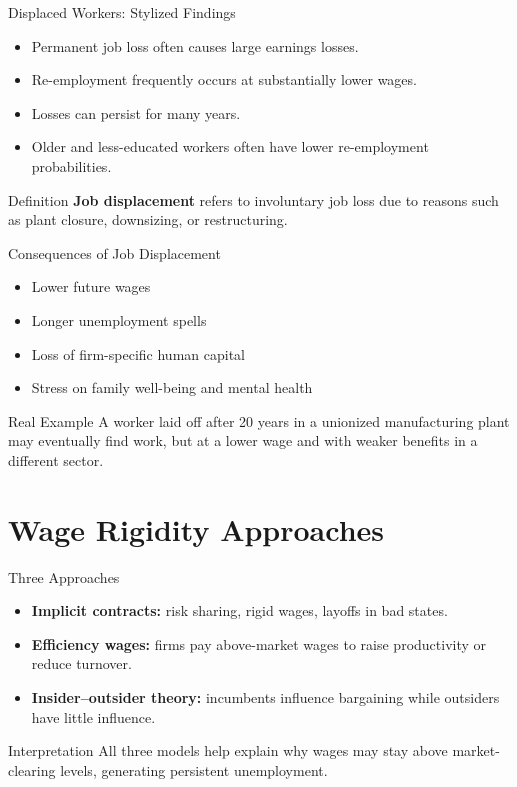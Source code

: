 \documentclass[aspectratio=169]{beamer}
\begin{document}
\begin{frame}{Displaced Workers: Stylized Findings}
\transfade
\begin{itemize}[<+->]
  \item Permanent job loss often causes large earnings losses.
  \item Re-employment frequently occurs at substantially lower wages.
  \item Losses can persist for many years.
  \item Older and less-educated workers often have lower re-employment probabilities.
\end{itemize}

\begin{block}{Definition}
\textbf{Job displacement} refers to involuntary job loss due to reasons such as plant closure, downsizing, or restructuring.
\end{block}
\end{frame}

\begin{frame}{Consequences of Job Displacement}
\transfade
\begin{itemize}[<+->]
  \item Lower future wages
  \item Longer unemployment spells
  \item Loss of firm-specific human capital
  \item Stress on family well-being and mental health
\end{itemize}

\begin{exampleblock}{Real Example}
A worker laid off after 20 years in a unionized manufacturing plant may eventually find work, but at a lower wage and with weaker benefits in a different sector.
\end{exampleblock}
\end{frame}

\section{Wage Rigidity Approaches}

\begin{frame}{Three Approaches}
\transfade
\begin{itemize}[<+->]
  \item \textbf{Implicit contracts:} risk sharing, rigid wages, layoffs in bad states.
  \item \textbf{Efficiency wages:} firms pay above-market wages to raise productivity or reduce turnover.
  \item \textbf{Insider--outsider theory:} incumbents influence bargaining while outsiders have little influence.
\end{itemize}

\begin{block}{Interpretation}
All three models help explain why wages may stay above market-clearing levels, generating persistent unemployment.
\end{block}
\end{frame}
\end{document}
